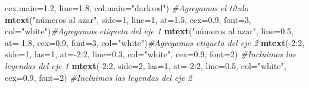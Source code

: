 \documentclass[]{article}
\newenvironment{Shaded}{\begin{snugshade}}{\end{snugshade}}
\newcommand{\KeywordTok}[1]{\textcolor[rgb]{0.13,0.29,0.53}{\textbf{{#1}}}}
\newcommand{\DataTypeTok}[1]{\textcolor[rgb]{0.13,0.29,0.53}{{#1}}}
\newcommand{\DecValTok}[1]{\textcolor[rgb]{0.00,0.00,0.81}{{#1}}}
\newcommand{\FloatTok}[1]{\textcolor[rgb]{0.00,0.00,0.81}{{#1}}}
\newcommand{\StringTok}[1]{\textcolor[rgb]{0.31,0.60,0.02}{{#1}}}
\newcommand{\CommentTok}[1]{\textcolor[rgb]{0.56,0.35,0.01}{\textit{{#1}}}}
\newcommand{\NormalTok}[1]{{#1}}
\begin{document}
\begin{Shaded}
\begin{Highlighting}[]
      \DataTypeTok{cex.main=}\FloatTok{1.2}\NormalTok{, }\DataTypeTok{line=}\FloatTok{1.8}\NormalTok{, }\DataTypeTok{col.main=}\StringTok{"darkred"}\NormalTok{) }\CommentTok{#Agregamos el título}
\KeywordTok{mtext}\NormalTok{(}\StringTok{"números al azar"}\NormalTok{, }\DataTypeTok{side=}\DecValTok{1}\NormalTok{, }\DataTypeTok{line=}\DecValTok{1}\NormalTok{, }\DataTypeTok{at=}\FloatTok{1.5}\NormalTok{, }
      \DataTypeTok{cex=}\FloatTok{0.9}\NormalTok{, }\DataTypeTok{font=}\DecValTok{3}\NormalTok{, }\DataTypeTok{col=}\StringTok{"white"}\NormalTok{)}\CommentTok{#Agregamos etiqueta del eje 1}
\KeywordTok{mtext}\NormalTok{(}\StringTok{"números al azar"}\NormalTok{, }\DataTypeTok{line=}\FloatTok{0.5}\NormalTok{, }\DataTypeTok{at=}\NormalTok{-}\FloatTok{1.8}\NormalTok{, }
      \DataTypeTok{cex=}\FloatTok{0.9}\NormalTok{, }\DataTypeTok{font=}\DecValTok{3}\NormalTok{, }\DataTypeTok{col=}\StringTok{"white"}\NormalTok{)}\CommentTok{#Agregamos etiqueta del eje 2 }
\KeywordTok{mtext}\NormalTok{(-}\DecValTok{2}\NormalTok{:}\DecValTok{2}\NormalTok{, }\DataTypeTok{side=}\DecValTok{1}\NormalTok{, }\DataTypeTok{las=}\DecValTok{1}\NormalTok{, }\DataTypeTok{at=}\NormalTok{-}\DecValTok{2}\NormalTok{:}\DecValTok{2}\NormalTok{, }\DataTypeTok{line=}\FloatTok{0.3}\NormalTok{, }
      \DataTypeTok{col=}\StringTok{"white"}\NormalTok{, }\DataTypeTok{cex=}\FloatTok{0.9}\NormalTok{, }\DataTypeTok{font=}\DecValTok{2}\NormalTok{) }\CommentTok{#Incluimos las leyendas del eje 1}
\KeywordTok{mtext}\NormalTok{(-}\DecValTok{2}\NormalTok{:}\DecValTok{2}\NormalTok{, }\DataTypeTok{side=}\DecValTok{2}\NormalTok{, }\DataTypeTok{las=}\DecValTok{1}\NormalTok{, }\DataTypeTok{at=}\NormalTok{-}\DecValTok{2}\NormalTok{:}\DecValTok{2}\NormalTok{, }\DataTypeTok{line=}\FloatTok{0.5}\NormalTok{,}
      \DataTypeTok{col=}\StringTok{"white"}\NormalTok{, }\DataTypeTok{cex=}\FloatTok{0.9}\NormalTok{, }\DataTypeTok{font=}\DecValTok{2}\NormalTok{) }\CommentTok{#Incluimos las leyendas del eje 2}
\end{Highlighting}
\end{Shaded}
\end{document}
